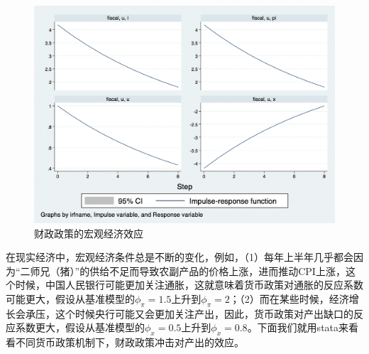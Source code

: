 \documentclass[cn,12pt,math=newtx,citestyle=gb7714-2015,bibstyle=gb7714-2015]{elegantbook}
\begin{document}
    \begin{figure}[tbph]
    	\centering
    	\includegraphics[width=1\linewidth]{fiscal}
    	\caption{财政政策的宏观经济效应}
    	\label{fig:fiscal}
    \end{figure}
	
	在现实经济中，宏观经济条件总是不断的变化，例如，（1）每年上半年几乎都会因为“二师兄（猪）”的供给不足而导致农副产品的价格上涨，进而推动CPI上涨，这个时候，中国人民银行可能更加关注通胀，这就意味着货币政策对通胀的反应系数可能更大，假设从基准模型的$\phi_\pi= 1.5$上升到$\phi_\pi= 2$；（2）而在某些时候，经济增长会承压，这个时候央行可能又会更加关注产出，因此，货币政策对产出缺口的反应系数更大，假设从基准模型的$\phi_x= 0.5$上升到$\phi_x= 0.8$。下面我们就用stata来看看不同货币政策机制下，财政政策冲击对产出的效应。
	
\end{document}

